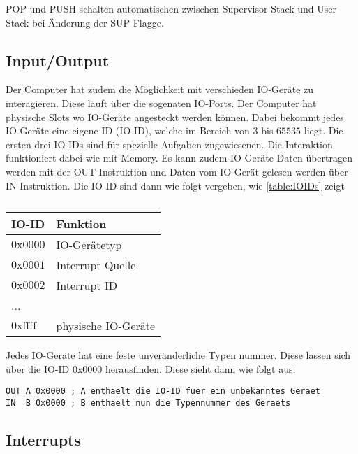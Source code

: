 \documentclass{scrartcl}
\begin{document}
POP und PUSH schalten automatischen zwischen Supervisor Stack und User Stack bei Änderung der SUP Flagge.

\subsection{\label{section:io}Input/Output}

Der Computer hat zudem die Möglichkeit mit verschieden IO-Geräte zu interagieren. Diese läuft über die sogenaten IO-Ports. Der Computer hat physische Slots wo IO-Geräte angesteckt werden können. Dabei bekommt jedes IO-Geräte eine eigene ID (IO-ID), welche im Bereich von $3$ bis $65535$ liegt. Die ersten drei IO-IDs sind für spezielle Aufgaben zugewiesenen. Die Interaktion funktioniert dabei wie mit Memory. Es kann zudem IO-Geräte Daten übertragen werden mit der OUT Instruktion und Daten vom IO-Gerät gelesen werden über IN Instruktion. Die IO-ID sind dann wie folgt vergeben, wie \autoref{table:IOIDs} zeigt

\begin{center}
	\begin{table}[h]
		\caption{\label{table:IOIDs}}
		\begin{tabular}{l | l}
			IO-ID & Funktion \\
			\hline
			$0\text{x}0000$ & IO-Gerätetyp \\
			$0\text{x}0001$ & Interrupt Quelle \\
			$0\text{x}0002$ & Interrupt ID \\
			... & \\
			$0\text{xffff}$ & physische IO-Geräte
 		\end{tabular}
	\end{table}
\end{center}

Jedes IO-Geräte hat eine feste unveränderliche Typen nummer. Diese lassen sich über die IO-ID $0\text{x}0000$ herausfinden. Diese sieht dann wie folgt aus: 

\begin{lstlisting}[style=asm]
OUT A 0x0000 ; A enthaelt die IO-ID fuer ein unbekanntes Geraet 
IN  B 0x0000 ; B enthaelt nun die Typennummer des Geraets
\end{lstlisting}

\subsection{\label{section:interrupts}Interrupts}
\end{document}
